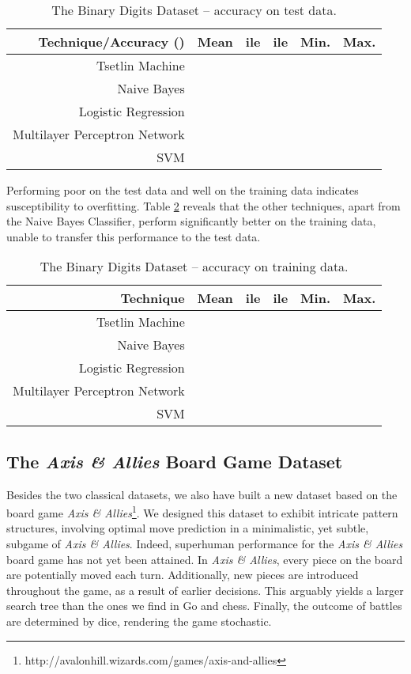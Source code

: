 \documentclass[11pt,a4paper]{article}
\begin{document}
\begin{table}[!bh]
    \centering
    \begin{tabular}{r||c|c|c|c|c}
         \bf Technique/Accuracy ()&\bf Mean&\bf ile &\bf ile&\bf Min.&\bf Max.\\
         \hline
    Tsetlin Machine&&&&&\\
    Naive Bayes&&&&&\\
    Logistic Regression&&&&&\\
    Multilayer Perceptron Network&&&&&\\
    SVM&&&&&
    \end{tabular}
    \caption{The Binary Digits Dataset -- accuracy on test data.}
    \label{tab:accuracy_binary_digits_test}
\end{table}

Performing poor on the test data and well on the training data indicates susceptibility to overfitting. Table \ref{tab:accuracy_binary_digits_training} reveals that the other techniques, apart from the Naive Bayes Classifier, perform significantly better on the training data, unable to transfer this performance to the test data.

\begin{table}[!bh]
    \centering
    \begin{tabular}{r||c|c|c|c|c}
         \bf Technique&\bf Mean&\bf ile &\bf ile&\bf Min.&\bf Max.\\
         \hline
    Tsetlin Machine&&&&&\\
    Naive Bayes&&&&&\\
    Logistic Regression&&&&&\\
    Multilayer Perceptron Network&&&&&\\
    SVM&&&&&
    \end{tabular}
    \caption{The Binary Digits Dataset -- accuracy on training data.}
    \label{tab:accuracy_binary_digits_training}
\end{table}

\subsection{The \emph{Axis \& Allies} Board Game Dataset}

Besides the two classical datasets, we also have built a new dataset based on the board game \emph{Axis \& Allies}\footnote{http://avalonhill.wizards.com/games/axis-and-allies}. 
We designed this dataset to exhibit intricate pattern structures, involving optimal move prediction in a minimalistic, yet subtle, subgame of \emph{Axis \& Allies}. Indeed, superhuman performance for the \emph{Axis \& Allies} board game has not yet been attained. In \emph{Axis \& Allies}, every piece on the board are potentially moved each turn. Additionally, new pieces are introduced throughout the game, as a result of earlier decisions. This arguably yields a larger search tree than the ones we find in Go and chess. Finally, the outcome of battles are determined by dice, rendering the game stochastic.
\end{document}
